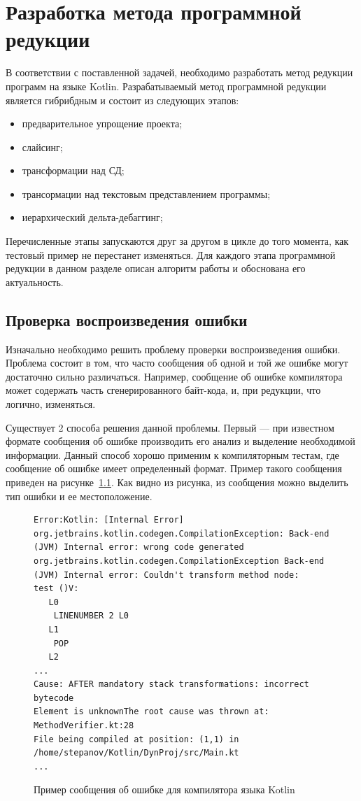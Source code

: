 \chapter{Разработка метода программной редукции}
В соответствии с поставленной задачей, необходимо разработать метод редукции программ на языке Kotlin.
Разрабатываемый метод программной редукции является гибрибдным и состоит из следующих этапов: 
\begin{itemize}
	\item предварительное упрощение проекта;
	\item слайсинг;
	\item трансформации над СД;
	\item трансормации над текстовым представлением программы;
	\item иерархический дельта-дебаггинг;
\end{itemize}
Перечисленные этапы запускаются друг за другом в цикле до того момента, как тестовый пример не перестанет изменяться. Для каждого этапа программной редукции в данном разделе описан алгоритм работы и обоснована его актуальность.


\section{Проверка воспроизведения ошибки}
Изначально необходимо решить проблему проверки воспроизведения ошибки. Проблема состоит в том, что часто сообщения об одной и той же ошибке могут достаточно сильно различаться. Например, сообщение об ошибке компилятора может содержать часть сгенерированного байт-кода, и, при редукции, что логично, изменяться. 

Существует 2 способа решения данной проблемы. Первый --- при известном формате сообщения об ошибке производить его анализ и выделение необходимой информации. Данный способ хорошо применим к компиляторным тестам, где сообщение об ошибке имеет определенный формат. Пример такого сообщения приведен на рисунке~\ref{ex:error}. Как видно из рисунка, из сообщения можно выделить тип ошибки и ее местоположение.
\begin{figure}
\begin{lstlisting}
Error:Kotlin: [Internal Error] org.jetbrains.kotlin.codegen.CompilationException: Back-end (JVM) Internal error: wrong code generated
org.jetbrains.kotlin.codegen.CompilationException Back-end (JVM) Internal error: Couldn't transform method node:
test ()V:
   L0
    LINENUMBER 2 L0
   L1
    POP
   L2
...
Cause: AFTER mandatory stack transformations: incorrect bytecode
Element is unknownThe root cause was thrown at: MethodVerifier.kt:28
File being compiled at position: (1,1) in /home/stepanov/Kotlin/DynProj/src/Main.kt
...
\end{lstlisting}
\caption{\label{ex:error}Пример сообщения об ошибке для компилятора языка Kotlin}
\end{figure} 

